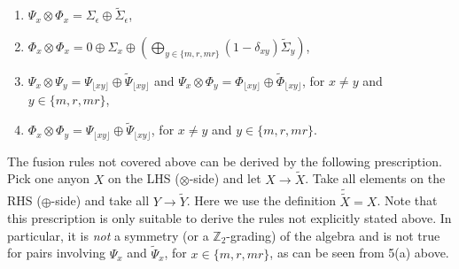 \documentclass[a4paper,twocolumn,11pt]{quantumarticle}
\begin{document}
\begin{enumerate}
\begin{enumerate}
		\item $\Psi_x \otimes \Phi_x = \Sigma_\epsilon \oplus \tilde\Sigma_\epsilon$,
		\item $\Phi_x \otimes \Phi_x = 0 \oplus \Sigma_x \oplus (\bigoplus_{y \in \{m, r, mr\}}(1-\delta_{xy})\tilde\Sigma_y)$,
		\item $\Psi_x \otimes \Psi_y = \Psi_{\lfloor xy \rfloor} \oplus \tilde\Psi_{\lfloor xy \rfloor}$ and $\Psi_x \otimes \Phi_y = \Phi_{\lfloor xy \rfloor} \oplus \tilde\Phi_{\lfloor xy \rfloor}$, for $x \neq y$ and $y \in \{m, r, mr\}$,
		\item $\Phi_x \otimes \Phi_y  = \Psi_{\lfloor xy \rfloor} \oplus \tilde\Psi_{\lfloor xy \rfloor}$, for $x \neq y$ and $y \in \{m, r, mr\}$.
\end{enumerate}
\end{enumerate}
The fusion rules not covered above can be derived by the following prescription. Pick one anyon $X$ on the LHS ($\otimes$-side) and let $X \rightarrow \tilde X$. Take all elements on the RHS ($\oplus$-side) and take all $Y \rightarrow \tilde Y$. Here we use the definition $\tilde{\tilde{X}} = X$. 
	Note that this prescription is only suitable to derive the rules not explicitly stated above. In particular, it is \emph{not} a symmetry (or a $\mathbb{Z}_2$-grading) of the algebra and is not true for pairs involving $\Psi_x$ and $\tilde\Psi_x$, for $x \in \{m, r, mr\}$, as can be seen from 5(a) above.
\end{document}
